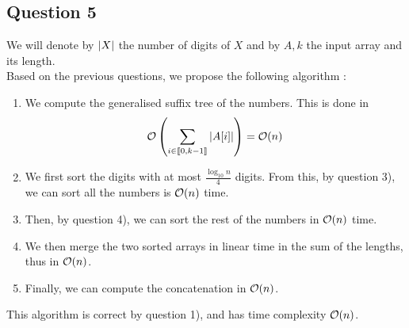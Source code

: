 \documentclass{cours}
\begin{document}
        \subsection{Question 5}
        We will denote by $\left|X\right|$ the number of digits of $X$ and by $A, k$ the input array and its length.\\
        Based on the previous questions, we propose the following algorithm :
        \begin{enumerate}
            \item We compute the generalised suffix tree of the numbers. This is done in \[\mathcal{O}\left(\sum_{i \in \llbracket 0, k - 1\rrbracket}\left|A[i]\right|\right) = \mathcal{O}(n)\]
            \item We first sort the digits with at most $\frac{\log_{10} n}{4}$ digits.  From this, by question 3), we can sort all the numbers is $\mathcal{O}(n)$ time.
            \item Then, by question 4), we can sort the rest of the numbers in $\mathcal{O}(n)$ time.
            \item We then merge the two sorted arrays in linear time in the sum of the lengths, thus in $\mathcal{O}(n)$.
            \item Finally, we can compute the concatenation in $\mathcal{O}(n)$.
        \end{enumerate}
        This algorithm is correct by question 1), and has time complexity $\mathcal{O}(n)$.
\end{document}
